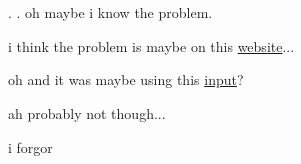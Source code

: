 \section*{}
\section*{}
\section*{}

\newpage
\vspace{90 cm}
.
\newpage
\vspace{90 cm}
.
\newpage
\vspace{90 cm}
oh maybe i know the problem.


\newpage
\vspace{90 cm}
i think
\newpage
\vspace{90 cm}
the problem is maybe on this \href{https://pofinal24.kattis.com/contests/pofinal24}{website}...


\newpage
\vspace{90 cm}
oh and it was maybe using this \href{https://github.com/hairez/random-files/blob/main/cool-numbers-001.txt}{input}? 



\newpage
\vspace{90 cm}
ah probably not though...


\newpage
\vspace{90 cm}
i forgor
